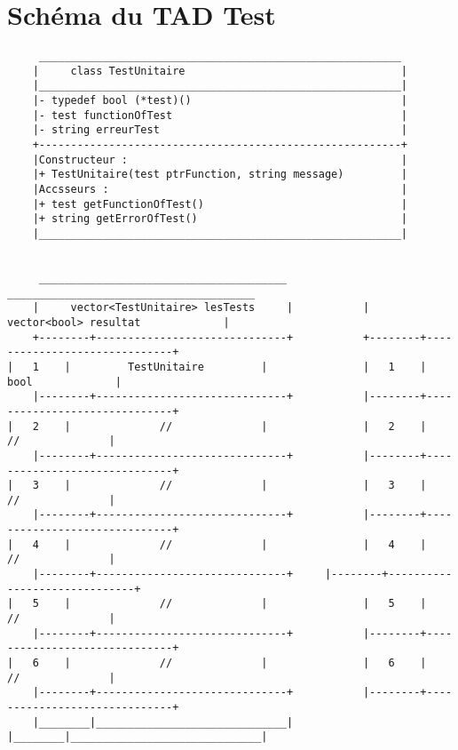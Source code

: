 \documentclass{article}
\begin{document}
	\maketitle
	\section{Schéma du TAD Test}
		\begin{verbatim}
	 _________________________________________________________
	|     class TestUnitaire                                  |
	|_________________________________________________________|
	|- typedef bool (*test)()                                 |
	|- test functionOfTest                                    |
	|- string erreurTest                                      |
	+---------------------------------------------------------+
	|Constructeur :                                           |
	|+ TestUnitaire(test ptrFunction, string message)         |
	|Accsseurs :                                              |
	|+ test getFunctionOfTest()                               |
	|+ string getErrorOfTest()                                |
	|_________________________________________________________|

	
	 _______________________________________		     _______________________________________ 
	|     vector<TestUnitaire> lesTests     |		    |     vector<bool> resultat             |
	+--------+------------------------------+		    +--------+------------------------------+
|   1    |         TestUnitaire         |			    |   1    |             bool             |
	|--------+------------------------------+		    |--------+------------------------------+
|   2    |              //              |			    |   2    |              //              |
	|--------+------------------------------+		    |--------+------------------------------+
|   3    |              //              |			    |   3    |              //              |
	|--------+------------------------------+		    |--------+------------------------------+
|   4    |              //              |			    |   4    |              //              |
	|--------+------------------------------+     |--------+------------------------------+
|   5    |              //              |			    |   5    |              //              |
	|--------+------------------------------+		    |--------+------------------------------+
|   6    |              //              |			    |   6    |              //              |
	|--------+------------------------------+		    |--------+------------------------------+
	|________|______________________________|		    |________|______________________________|

		\end{verbatim}
\end{document}
